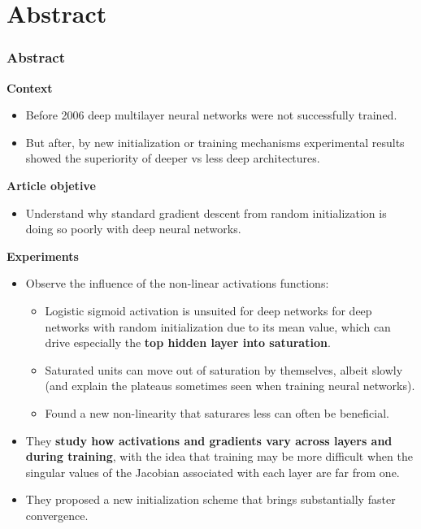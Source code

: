 \section{Abstract}
\begin{frame}
  \frametitle{Abstract}

  \textbf{Context}
  \begin{itemize}
    \item Before 2006 deep multilayer neural networks were not successfully trained. 
    \item But after, by new initialization or training mechanisms experimental results showed the superiority of deeper vs less deep architectures. 
  \end{itemize}

  \textbf{Article objetive}
  \begin{itemize}
    \item Understand why standard gradient descent from random initialization is doing so poorly with deep neural networks. 
  \end{itemize}

  
\end{frame}
    
\begin{frame}
  
  \textbf{Experiments}
  \begin{itemize}
    \item Observe the influence of the non-linear activations functions:
    \begin{itemize}
      \item Logistic sigmoid activation is unsuited for deep networks for deep networks with random initialization due to its mean value, which can drive especially the \textbf{top hidden layer into saturation}. 
      \item Saturated units can move out of saturation by themselves, albeit slowly (and explain the plateaus sometimes seen when training neural networks). 
      \item Found a new non-linearity that saturares less can often be beneficial. 
  \end{itemize}
    \item They \textbf{study how activations and gradients vary across layers and during training}, with the idea that training may be more difficult when the singular values of the Jacobian associated with each layer are far from one. 
    \item They proposed a new initialization scheme that brings substantially faster convergence. 
  \end{itemize}
  
\end{frame}

